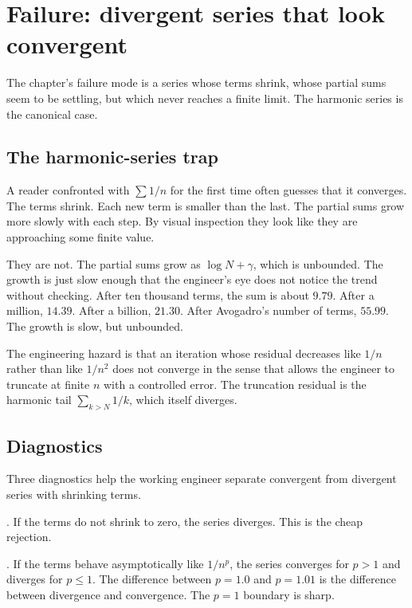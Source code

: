 \section{Failure: divergent series that look convergent}

The chapter's failure mode is a series whose terms shrink, whose
partial sums seem to be settling, but which never reaches a finite
limit. The harmonic series is the canonical case.

\subsection{The harmonic-series trap}

A reader confronted with $\sum 1/n$ for the first time often guesses
that it converges. The terms shrink. Each new term is smaller than the
last. The partial sums grow more slowly with each step. By visual
inspection they look like they are approaching some finite value.

They are not. The partial sums grow as $\log N + \gamma$, which is
unbounded. The growth is just slow enough that the engineer's eye does
not notice the trend without checking. After ten thousand terms, the
sum is about $9.79$. After a million, $14.39$. After a billion, $21.30$.
After Avogadro's number of terms, $55.99$. The growth is slow, but
unbounded.

The engineering hazard is that an iteration whose residual decreases
like $1/n$ rather than like $1/n^{2}$ does not converge in the sense
that allows the engineer to truncate at finite $n$ with a controlled
error. The truncation residual is the harmonic tail $\sum_{k > N} 1/k$,
which itself diverges.

\subsection{Diagnostics}

Three diagnostics help the working engineer separate convergent from
divergent series with shrinking terms.

. If the terms do not shrink to zero,
the series diverges. This is the cheap rejection.

. If the terms behave asymptotically
like $1/n^{p}$, the series converges for $p > 1$ and diverges for
$p \leq 1$. The difference between $p = 1.0$ and $p = 1.01$ is the
difference between divergence and convergence. The $p = 1$ boundary is
sharp.

